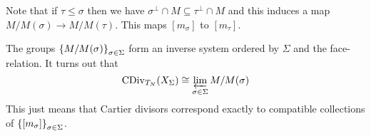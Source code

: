 Note that if $\tau\leq \sigma$ then we have $\sigma^\perp\cap M\subseteq \tau^\perp\cap M$ and this induces a map $M/M(\sigma)\to M/M(\tau)$. This maps $[m_\sigma]$ to $[m_\tau]$.

The groups $\left\{{M/M(\sigma)}\right\}_{\sigma\in \Sigma}$ form an inverse system ordered by $\Sigma$ and the face-relation. It turns out that
\[\operatorname{CDiv}_{T_N}(X_\Sigma)\cong \varprojlim_{\sigma\in \Sigma}M/M(\sigma)\]
This just means that Cartier divisors correspond exactly to compatible collections of $\left\{{[m_\sigma]}\right\}_{\sigma\in \Sigma}$.










